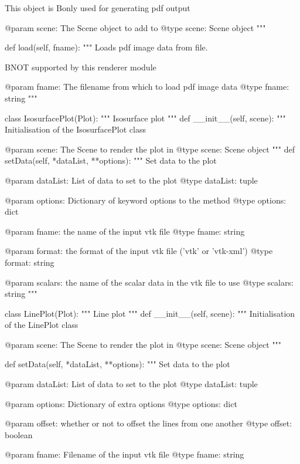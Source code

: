 \begin{python}
\begin{python}
\begin{verbose}
        This object is B{only} used for generating pdf output

        @param scene: The Scene object to add to
        @type scene: Scene object
        """

    def load(self, fname):
        """
        Loads pdf image data from file.

        B{NOT} supported by this renderer module

        @param fname: The filename from which to load pdf image data
        @type fname: string
        """

class IsosurfacePlot(Plot):
    """
    Isosurface plot
    """
    def __init__(self, scene):
        """
        Initialisation of the IsosurfacePlot class
        
        @param scene: The Scene to render the plot in
        @type scene: Scene object
        """
    def setData(self, *dataList, **options):
        """
        Set data to the plot

        @param dataList: List of data to set to the plot
        @type dataList: tuple

        @param options: Dictionary of keyword options to the method
        @type options: dict

	@param fname: the name of the input vtk file
	@type fname: string

	@param format: the format of the input vtk file ('vtk' or 'vtk-xml')
	@type format: string

	@param scalars: the name of the scalar data in the vtk file to use
	@type scalars: string
        """

class LinePlot(Plot):
    """
    Line plot
    """
    def __init__(self, scene):
        """
        Initialisation of the LinePlot class
        
        @param scene: The Scene to render the plot in
        @type scene: Scene object
        """

    def setData(self, *dataList, **options):
        """
        Set data to the plot

        @param dataList: List of data to set to the plot
        @type dataList: tuple

	@param options: Dictionary of extra options
	@type options: dict

	@param offset: whether or not to offset the lines from one another
	@type offset: boolean

	@param fname: Filename of the input vtk file
	@type fname: string


\end{verbose}
\end{python}
\end{python}
